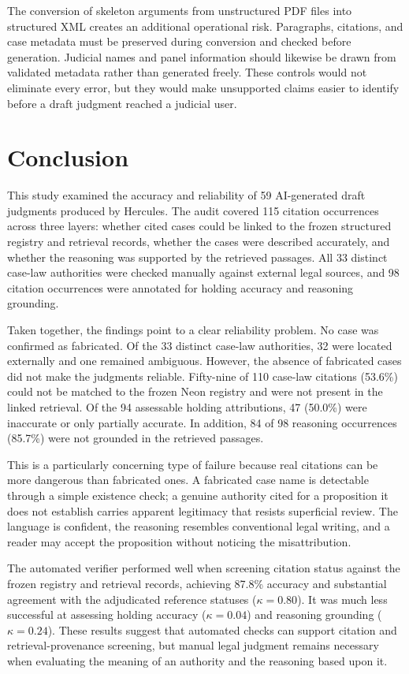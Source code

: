 \documentclass[conference]{IEEEtran}
\begin{document}
The conversion of skeleton arguments from unstructured PDF files into structured XML creates an additional operational risk. Paragraphs, citations, and case metadata must be preserved during conversion and checked before generation. Judicial names and panel information should likewise be drawn from validated metadata rather than generated freely. These controls would not eliminate every error, but they would make unsupported claims easier to identify before a draft judgment reached a judicial user.

\section{Conclusion}

This study examined the accuracy and reliability of 59 AI-generated draft judgments produced by Hercules. The audit covered 115 citation occurrences across three layers: whether cited cases could be linked to the frozen structured registry and retrieval records, whether the cases were described accurately, and whether the reasoning was supported by the retrieved passages. All 33 distinct case-law authorities were checked manually against external legal sources, and 98 citation occurrences were annotated for holding accuracy and reasoning grounding.

Taken together, the findings point to a clear reliability problem. No case was confirmed as fabricated. Of the 33 distinct case-law authorities, 32 were located externally and one remained ambiguous. However, the absence of fabricated cases did not make the judgments reliable. Fifty-nine of 110 case-law citations (53.6\%) could not be matched to the frozen Neon registry and were not present in the linked retrieval. Of the 94 assessable holding attributions, 47 (50.0\%) were inaccurate or only partially accurate. In addition, 84 of 98 reasoning occurrences (85.7\%) were not grounded in the retrieved passages.

This is a particularly concerning type of failure because real citations can be more dangerous than fabricated ones. A fabricated case name is detectable through a simple existence check; a genuine authority cited for a proposition it does not establish carries apparent legitimacy that resists superficial review. The language is confident, the reasoning resembles conventional legal writing, and a reader may accept the proposition without noticing the misattribution.

The automated verifier performed well when screening citation status against the frozen registry and retrieval records, achieving 87.8\% accuracy and substantial agreement with the adjudicated reference statuses ($\kappa = 0.80$). It was much less successful at assessing holding accuracy ($\kappa = 0.04$) and reasoning grounding ($\kappa = 0.24$). These results suggest that automated checks can support citation and retrieval-provenance screening, but manual legal judgment remains necessary when evaluating the meaning of an authority and the reasoning based upon it.
\end{document}
